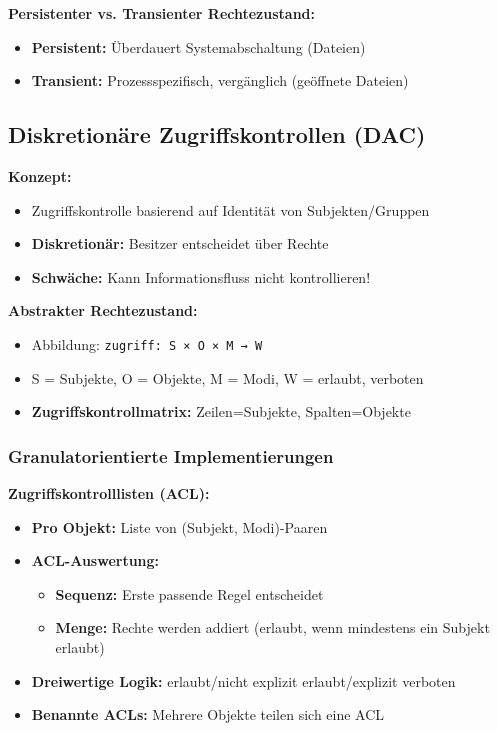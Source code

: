 \documentclass[9pt,a4paper]{extarticle}
\begin{document}
\begin{multicols*}{2}
\textbf{Persistenter vs. Transienter Rechtezustand:}
\begin{itemize}
\item \textbf{Persistent:} Überdauert Systemabschaltung (Dateien)
\item \textbf{Transient:} Prozessspezifisch, vergänglich (geöffnete Dateien)
\end{itemize}

\subsection{Diskretionäre Zugriffskontrollen (DAC)}
\textbf{Konzept:}
\begin{itemize}
\item Zugriffskontrolle basierend auf Identität von Subjekten/Gruppen
\item \textbf{Diskretionär:} Besitzer entscheidet über Rechte
\item \textbf{Schwäche:} Kann Informationsfluss nicht kontrollieren!
\end{itemize}

\textbf{Abstrakter Rechtezustand:}
\begin{itemize}
\item Abbildung: \texttt{zugriff: S × O × M → W}
\item S = Subjekte, O = Objekte, M = Modi, W = {erlaubt, verboten}
\item \textbf{Zugriffskontrollmatrix:} Zeilen=Subjekte, Spalten=Objekte
\end{itemize}

\subsubsection{Granulatorientierte Implementierungen}
\textbf{Zugriffskontrolllisten (ACL):}
\begin{itemize}
\item \textbf{Pro Objekt:} Liste von (Subjekt, Modi)-Paaren
\item \textbf{ACL-Auswertung:}
  \begin{itemize}
  \item \textbf{Sequenz:} Erste passende Regel entscheidet
  \item \textbf{Menge:} Rechte werden addiert (erlaubt, wenn mindestens ein Subjekt erlaubt)
  \end{itemize}
\item \textbf{Dreiwertige Logik:} erlaubt/nicht explizit erlaubt/explizit verboten
\item \textbf{Benannte ACLs:} Mehrere Objekte teilen sich eine ACL
\end{itemize}


\end{multicols*}
\end{document}
